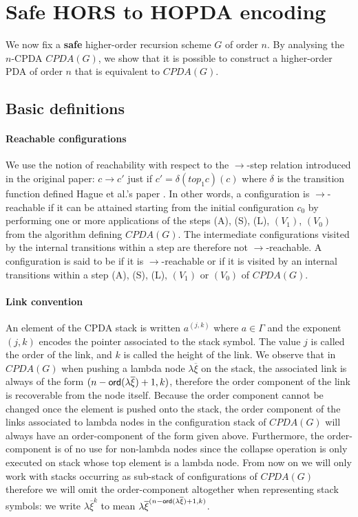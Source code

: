 \documentclass[a4paper]{article}
\theoremstyle{remark}
\theoremstyle{definition}
\begin{document}
\section{Safe HORS to HOPDA encoding}

We now fix a {\bf safe} higher-order recursion scheme $G$ of order $n$.
By analysing the $n$-CPDA $CPDA(G)$, we show that it is possible to construct a higher-order PDA of order $n$ that is equivalent to $CPDA(G)$.


\subsection{Basic definitions}

\paragraph{Reachable configurations}
We use the notion of reachability with respect to the $\rightarrow$-step relation introduced in the original paper:
$c\rightarrow c'$ just if $c' = \delta(top_1 c)(c)$ where $\delta$ is the transition
function defined Hague et al.'s paper \cite[Figure 2]{hague-collaps-full}.
In other words, a configuration is $\rightarrow$-reachable if it can be attained starting from the initial configuration $c_0$ by performing one or more applications of the steps (A), (S), (L), $(V_1)$, $(V_0)$ from the algorithm defining $CPDA(G)$.
The intermediate configurations visited by the internal transitions within a step are therefore not $\rightarrow$-reachable.
A configuration is said to be  if it is $\rightarrow$-reachable or if it is visited by an internal transitions
within a step (A), (S), (L), $(V_1)$ or $(V_0)$ of $CPDA(G)$.

\paragraph{Link convention}
An element of the CPDA stack is written $a^{(j,k)}$ where $a\in \Gamma$ and the exponent $(j,k)$
encodes the pointer associated to the stack symbol. The value $j$ is called the order of the link, and $k$ is called the height of the link. We observe that in $CPDA(G)$ when pushing a lambda node $\lambda \overline{\xi}$ on the stack, the associated link is always of the form $(n-{\sf ord}(\lambda \overline{\xi})+1, k)$, therefore the order component of the link is recoverable from the node itself. Because the order component cannot be changed once the element is pushed onto the stack, the order component of the links associated to lambda nodes in the configuration stack of $CPDA(G)$ will always have an order-component of the form given above.
Furthermore, the order-component is of no use for non-lambda nodes since the collapse operation is only executed on stack whose top element is a lambda node. From now on we will only work with stacks occurring as sub-stack of configurations of $CPDA(G)$
therefore we will omit the order-component altogether when representing stack symbols: we write $\lambda \overline{\xi}^{k}$ to mean $\lambda \overline{\xi}^{(n-{\sf ord}(\lambda \overline{\xi})+1,k)}$.
\end{document}
